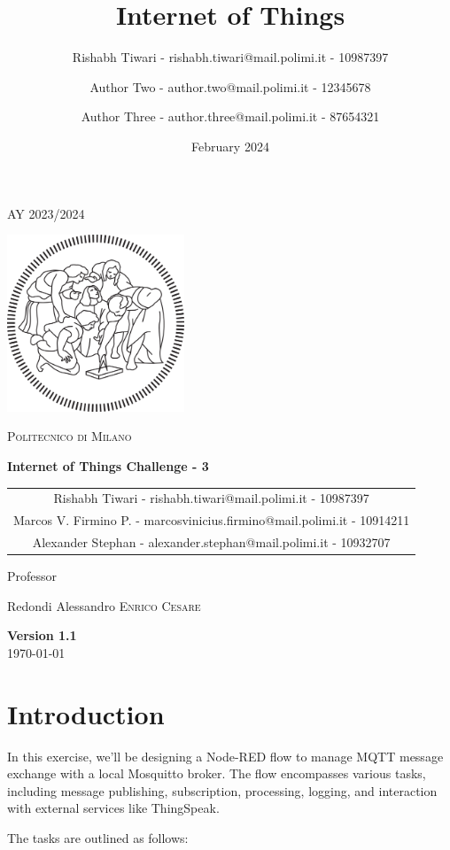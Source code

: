 \documentclass{article}
\title{Internet of Things}
\author{%
Rishabh Tiwari - rishabh.tiwari@mail.polimi.it - 10987397 \and
Author Two - author.two@mail.polimi.it - 12345678 \and
Author Three - author.three@mail.polimi.it - 87654321
}
\date{February 2024}
\begin{document}
\begin{titlepage}
    \centering
    {\scshape\large AY 2023/2024 \par}
    \vfill
    \includegraphics[width=150pt]{Images/PolimiLogo.png}\par\vspace{1cm}
    {\scshape\LARGE Politecnico di Milano \par}
    \vspace{1.5cm}
    {\huge\bfseries Internet of Things Challenge - 3\par}
    \vspace{2cm}
    {\Large \begin{tabular}{c}
    Rishabh Tiwari - rishabh.tiwari@mail.polimi.it - 10987397\\
    Marcos V. Firmino P. - marcosvinicius.firmino@mail.polimi.it
 - 10914211\\
    Alexander Stephan - alexander.stephan@mail.polimi.it - 10932707
    \end{tabular}\par}
    \vfill
    {\large Professor\par
        Redondi Alessandro \textsc{Enrico Cesare}}
    \vfill
    {\large \textbf{Version 1.1}\\ \today \par}
\end{titlepage}
\thispagestyle{plain}
\mbox{}
\section{Introduction}
In this exercise, we'll be designing a Node-RED flow to manage MQTT message exchange with a local Mosquitto broker. The flow encompasses various tasks, including message publishing, subscription, processing, logging, and interaction with external services like ThingSpeak.

The tasks are outlined as follows:
\end{document}
